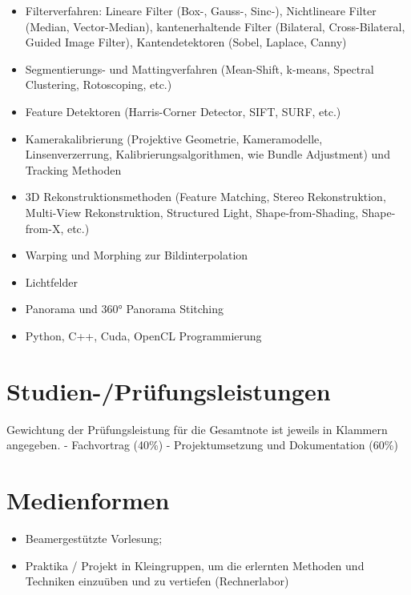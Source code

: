 \begin{itemize}
\tightlist
\item
  Filterverfahren: Lineare Filter (Box-, Gauss-, Sinc-), Nichtlineare
  Filter (Median, Vector-Median), kantenerhaltende Filter (Bilateral,
  Cross-Bilateral, Guided Image Filter), Kantendetektoren (Sobel,
  Laplace, Canny)
\item
  Segmentierungs- und Mattingverfahren (Mean-Shift, k-means, Spectral
  Clustering, Rotoscoping, etc.)
\item
  Feature Detektoren (Harris-Corner Detector, SIFT, SURF, etc.)
\item
  Kamerakalibrierung (Projektive Geometrie, Kameramodelle,
  Linsenverzerrung, Kalibrierungsalgorithmen, wie Bundle Adjustment) und
  Tracking Methoden
\item
  3D Rekonstruktionsmethoden (Feature Matching, Stereo Rekonstruktion,
  Multi-View Rekonstruktion, Structured Light, Shape-from-Shading,
  Shape-from-X, etc.)
\item
  Warping und Morphing zur Bildinterpolation
\item
  Lichtfelder
\item
  Panorama und 360° Panorama Stitching
\item
  Python, C++, Cuda, OpenCL Programmierung
\end{itemize}

\section*{Studien-/Prüfungsleistungen
\label{/mi-2017/modulbeschreibungen-master/MA_VC_Modul_BildbasierteComputergrafik}}\label{studien-pruxfcfungsleistungen-pathlabelmi-2017modulbeschreibungen-mastermaux5fvcux5fmodulux5fbildbasiertecomputergrafik}

Gewichtung der Prüfungsleistung für die Gesamtnote ist jeweils in
Klammern angegeben. - Fachvortrag (40\%) - Projektumsetzung und
Dokumentation (60\%)

\section*{Medienformen\label{/mi-2017/modulbeschreibungen-master/MA_VC_Modul_BildbasierteComputergrafik}}\label{medienformenpathlabelmi-2017modulbeschreibungen-mastermaux5fvcux5fmodulux5fbildbasiertecomputergrafik}

\begin{itemize}
\tightlist
\item
  Beamergestützte Vorlesung;
\item
  Praktika / Projekt in Kleingruppen, um die erlernten Methoden und
  Techniken einzuüben und zu vertiefen (Rechnerlabor)
\end{itemize}

